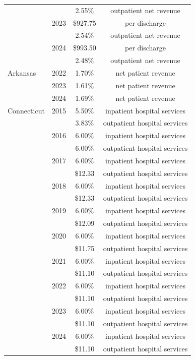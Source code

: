 \begin{longtable}{llcc}
 &  & 2.55\% & outpatient net revenue \\[0pt]
 & 2023 & \$927.75 & per discharge \\[0pt]
 &  & 2.54\% & outpatient net revenue \\[0pt]
 & 2024 & \$993.50 & per discharge \\[0pt]
 &  & 2.48\% & outpatient net revenue \\[0pt]
\midrule
Arkansas & 2022 & 1.70\% & net patient revenue \\[0pt]
 & 2023 & 1.61\% & net patient revenue \\[0pt]
 & 2024 & 1.69\% & net patient revenue \\[0pt]
\midrule
Connecticut & 2015 & 5.50\% & inpatient hospital services \\[0pt]
 &  & 3.83\% & outpatient hospital services \\[0pt]
 & 2016 & 6.00\% & inpatient hospital services \\[0pt]
 &  & 6.00\% & outpatient hospital services \\[0pt]
 & 2017 & 6.00\% & inpatient hospital services \\[0pt]
 &  & \$12.33 & outpatient hospital services \\[0pt]
 & 2018 & 6.00\% & inpatient hospital services \\[0pt]
 &  & \$12.33 & outpatient hospital services \\[0pt]
 & 2019 & 6.00\% & inpatient hospital services \\[0pt]
 &  & \$12.09 & outpatient hospital services \\[0pt]
 & 2020 & 6.00\% & inpatient hospital services \\[0pt]
 &  & \$11.75 & outpatient hospital services \\[0pt]
 & 2021 & 6.00\% & inpatient hospital services \\[0pt]
 &  & \$11.10 & outpatient hospital services \\[0pt]
 & 2022 & 6.00\% & inpatient hospital services \\[0pt]
 &  & \$11.10 & outpatient hospital services \\[0pt]
 & 2023 & 6.00\% & inpatient hospital services \\[0pt]
 &  & \$11.10 & outpatient hospital services \\[0pt]
 & 2024 & 6.00\% & inpatient hospital services \\[0pt]
 &  & \$11.10 & outpatient hospital services \\[0pt]

\end{longtable}
